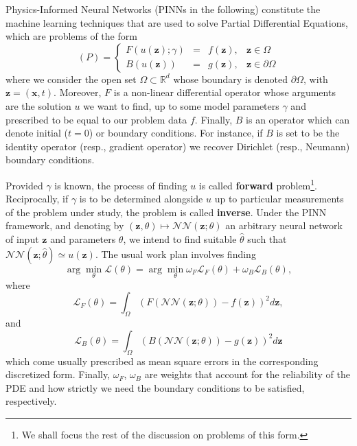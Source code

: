 \documentclass[12pt]{report} %
\newcommand{\tmmathbf}[1]{\ensuremath{\boldsymbol{#1}}}
\newcommand{\tmstrong}[1]{\textbf{#1}}
\begin{document}
Physics-Informed Neural Networks (PINNs in the following) constitute the
machine learning techniques that are used to solve Partial Differential
Equations, which are problems of the form
\begin{equation}
  (P) = \left\{\begin{array}{rlll}
    F (u (\tmmathbf{z}) ; \gamma) & = & f (\tmmathbf{z}), & \tmmathbf{z} \in
    \Omega\\
    B (u (\tmmathbf{z})) & = & g (\tmmathbf{z}), & \tmmathbf{z} \in \partial
    \Omega
  \end{array}\right. \label{pdegeneralform}
\end{equation}
where we consider the open set $\Omega \subset \mathbb{R}^d$ whose boundary is
denoted $\partial \Omega$, with $\tmmathbf{z}= (\tmmathbf{x}, t)$. Moreover,
\(F\) is a non-linear differential operator whose arguments are the solution $u$
we want to find, up to some model parameters $\gamma$ and prescribed to be
equal to our problem data \(f\). Finally, \(B\) is an operator which can denote
initial (\(t = 0\)) or boundary conditions. For instance, if $B$ is set to be
the identity operator (resp., gradient operator) we recover Dirichlet (resp.,
Neumann) boundary conditions.

Provided $\gamma$ is known, the process of finding $u$ is called
{\tmstrong{forward}} problem\footnote{We shall focus the rest of the
discussion on problems of this form.}. Reciprocally, if $\gamma$ is to be
determined alongside $u$ up to particular measurements of the problem under study, the problem is called {\tmstrong{inverse}}. Under
the PINN framework, and denoting by $(\tmmathbf{z}, \theta) \mapsto
\mathcal{N}\mathcal{N} (\tmmathbf{z}; \theta)$ an arbitrary neural network of input $\tmmathbf{z}$ and 
parameters $\theta$, we intend to find suitable $\hat{ \theta}$ such that
$\mathcal{N}\mathcal{N} (\tmmathbf{z}; \hat{ \theta}) \simeq u (\tmmathbf{z})$. The
usual work plan involves finding
\begin{equation}
   \arg \min_{\theta} \mathcal{L} (\theta) = \arg \min_{\theta} \omega_F
   \mathcal{L}_F (\theta) + \omega_B \mathcal{L}_B (\theta), 
   \label{loss-fun-pinn}
\end{equation}
where
\begin{equation}
   \mathcal{L}_F (\theta) = \int_{\Omega} (F (\mathcal{N}\mathcal{N}
   (\tmmathbf{z}; \theta)) - f (\tmmathbf{z}))^2 d\tmmathbf{z}, 
   \label{loss-F}
\end{equation}
and
\begin{equation}
    \mathcal{L}_B (\theta) = \int_{\Omega} (B (\mathcal{N}\mathcal{N}
   (\tmmathbf{z}; \theta)) - g (\tmmathbf{z}))^2 d\tmmathbf{z}
   \label{loss-boundary}
\end{equation}
which come usually prescribed as mean square errors in the corresponding
discretized form. Finally, $\omega_F$, $\omega_B$ are weights that account for the
reliability of the PDE and how strictly we need the boundary conditions to be
satisfied, respectively.
\end{document}
